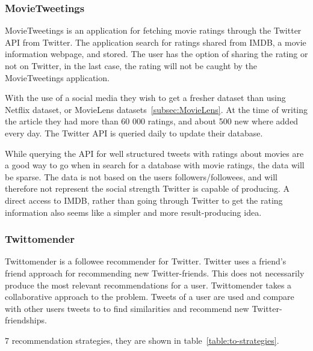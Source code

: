 \subsubsection{MovieTweetings}\label{subsec:MovieTweetings}
MovieTweetings is an application for fetching movie ratings through the Twitter API from Twitter. The application search for ratings shared from IMDB, a movie information webpage, and stored. The user has the option of sharing the rating or not on Twitter, in the last case, the rating will not be caught by the MovieTweetings application.

With the use of a social media they wish to get a fresher dataset than using Netflix dataset, or MovieLens datasets~\ref{subsec:MovieLens}. At the time of writing the article they had more than 60 000 ratings, and about 500 new where added every day\cite{MovieTweetings}. The Twitter API is queried daily to update their database.

While querying the API for well structured tweets with ratings about movies are a good way to go when in search for a database with movie ratings, the data will be sparse. The data is not based on the users followers/followees, and will therefore not represent the social strength Twitter is capable of producing. A direct access to IMDB, rather than going through Twitter to get the rating information also seems like a simpler and more result-producing idea.


\subsubsection{Twittomender}
Twittomender is a followee recommender for Twitter. Twitter uses a friend's friend approach for recommending new Twitter-friends. This does not necessarily produce the most relevant recommendations for a user. Twittomender takes a collaborative approach to the problem. Tweets of a user are used and compare with other users tweets to to find similarities and recommend new Twitter-friendships\cite{twittomender}.

7 recommendation strategies, they are shown in table~\ref{table:to-strategies}.

